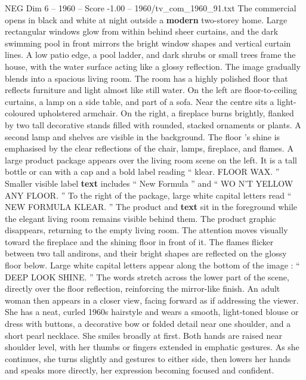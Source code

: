 \begin{textsample}{NEG Dim 6 – 1960 – Score -1.00 – 1960/tv\_com\_1960\_91.txt}  \label{ex:f6_neg_076}
The commercial opens in black and white at night outside a \textbf{modern} two-storey home.
Large rectangular windows glow from within behind sheer curtains, and the dark swimming pool in front mirrors the bright window shapes and vertical curtain lines.
A low patio edge, a pool ladder, and dark shrubs or small trees frame the house, with the water surface acting like a glossy reflection.
The image gradually blends into a spacious living room.
The room has a highly polished floor that reflects furniture and light almost like still water.
On the left are floor-to-ceiling curtains, a lamp on a side table, and part of a sofa.
Near the centre sits a light-coloured upholstered armchair.
On the right, a fireplace burns brightly, flanked by two tall decorative stands filled with rounded, stacked ornaments or plants.
A second lamp and shelves are visible in the background.
The floor ’s shine is emphasised by the clear reflections of the chair, lamps, fireplace, and flames.
A large product package appears over the living room scene on the left.
It is a tall bottle or can with a cap and a bold label reading “ klear.
FLOOR WAX. ” Smaller visible label \textbf{text} includes “ New Formula ” and “ WO N’T YELLOW ANY FLOOR. ” To the right of the package, large white capital letters read “ NEW FORMULA KLEAR. ” The product and \textbf{text} sit in the foreground while the elegant living room remains visible behind them.
The product graphic disappears, returning to the empty living room.
The attention moves visually toward the fireplace and the shining floor in front of it.
The flames flicker between two tall andirons, and their bright shapes are reflected on the glossy floor below.
Large white capital letters appear along the bottom of the image : “ DEEP LOOK SHINE. ” The words stretch across the lower part of the scene, directly over the floor reflection, reinforcing the mirror-like finish.
An adult woman then appears in a closer view, facing forward as if addressing the viewer.
She has a neat, curled 1960s hairstyle and wears a smooth, light-toned blouse or dress with buttons, a decorative bow or folded detail near one shoulder, and a short pearl necklace.
She smiles broadly at first.
Both hands are raised near shoulder level, with her thumbs or fingers extended in emphatic gestures.
As she continues, she turns slightly and gestures to either side, then lowers her hands and speaks more directly, her expression becoming focused and confident.

\end{textsample}

